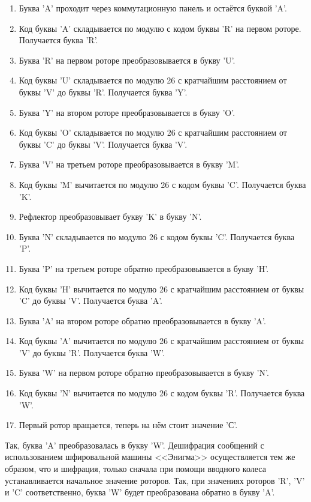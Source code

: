 \begin{enumerate}
	\item Буква 'A' проходит через коммутационную панель и остаётся буквой 'A'.
	\item Код буквы 'A' складывается по модулю с кодом буквы 'R' на первом роторе. Получается буква 'R'.
	\item Буква 'R' на первом роторе преобразовывается в букву 'U'.
	\item Код буквы 'U' складывается по модулю 26 с кратчайшим расстоянием от буквы 'V' до буквы 'R'. Получается буква 'Y'.
	\item Буква 'Y' на втором роторе преобразовывается в букву 'O'.
	\item Код буквы 'O' складывается по модулю 26 с кратчайшим расстоянием от буквы 'C' до буквы 'V'. Получается буква 'V'.
	\item Буква 'V' на третьем роторе преобразовывается в букву 'M'.
	\item Код буквы 'M' вычитается по модулю 26 с кодом буквы 'C'. Получается буква 'K'.
	\item Рефлектор преобразовывает букву 'K' в букву 'N'.
	\item Буква 'N' складывается по модулю 26 с кодом буквы 'C'. Получается буква 'P'.
	\item Буква 'P' на третьем роторе обратно преобразовывается в букву 'H'.
	\item Код буквы 'H' вычитается по модулю 26 с кратчайшим расстоянием от буквы 'C' до буквы 'V'. Получается буква 'A'.
	\item Буква 'A' на втором роторе обратно преобразовывается в букву 'A'.
	\item Код буквы 'A' вычитается по модулю 26 с кратчайшим расстоянием от буквы 'V' до буквы 'R'. Получается буква 'W'.
	\item Буква 'W' на первом роторе обратно преобразовывается в букву 'N'.
	\item Код буквы 'N' вычитается по модулю 26 с кодом буквы 'R'. Получается буква 'W'.
	\item Первый ротор вращается, теперь на нём стоит значение 'С'.
\end{enumerate}

Так, буква 'A' преобразовалась в букву 'W'. Дешифрация сообщений с использованием шфировальной машины <<Энигма>> осуществляется тем же образом, что и шифрация, только сначала при помощи вводного колеса устанавливается начальное значение роторов. Так, при значениях роторов 'R', 'V' и 'C' соответственно, буква 'W' будет преобразована обратно в букву 'A'.

